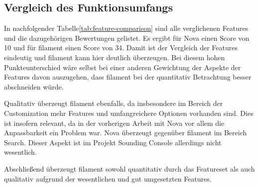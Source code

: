 \subsection{Vergleich des Funktionsumfangs}
In nachfolgender Tabelle\ref{tab:feature-comparison} sind alle verglichenen Features und die dazugehörigen Bewertungen gelistet.
Es ergibt für Nova einen Score von 10 und für filament einen Score von 34.
Damit ist der Vergleich der Features eindeutig und filament kann hier deutlich überzeugen.
Bei diesem hohen Punkteunterschied wäre selbst bei einer anderen Gewichtung der Aspekte der Features davon auszugehen, dass filament bei der quantitativ Betrachtung besser abschneiden würde.

Qualitativ überzeugt filament ebenfalls, da insbesondere im Bereich der Customization mehr Features und umfangreichere Optionen vorhanden sind.
Dies ist insofern relevant, da in der vorherigen Arbeit mit Nova vor allem die Anpassbarkeit ein Problem war.
Nova überzeugt gegenüber filament im Bereich Search.
Dieser Aspekt ist im Projekt Sounding Console allerdings nicht wesentlich.

Abschließend überzeugt filament sowohl quantitativ durch das Featureset als auch qualitativ aufgrund der wesentlichen und gut umgesetzten Features.


